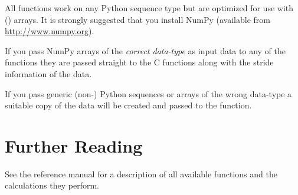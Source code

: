All functions work on any Python sequence type but are optimized for use with
\NUMPY{} (\numpy{}) arrays. It is strongly suggested that you install NumPy
(available from \url{http://www.numpy.org}).

If you pass NumPy arrays of the \emph{correct data-type} as input data
to any of the functions they are passed straight to the C functions
along with the stride information of the data.

If you pass generic (non-\numpy{}) Python sequences or \numpy{} arrays of the
wrong data-type a suitable copy of the data will be created and passed to the
function.


\section{Further Reading}
\label{sec:stat-further-reading}

See the \gsl{} reference manual for a description of all available functions
and the calculations they perform.


